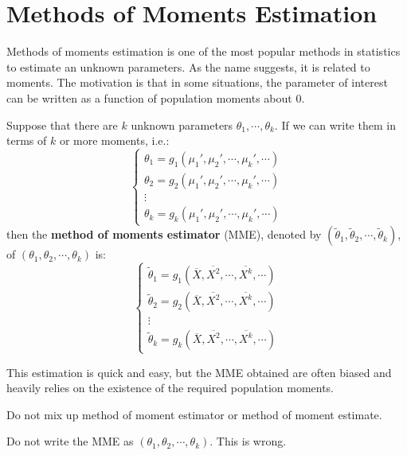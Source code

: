 \documentclass{huhtakm-template-book-v2}
\begin{document}
\section{Methods of Moments Estimation}
Methods of moments estimation is one of the most popular methods in statistics to estimate an unknown parameters. As the name suggests, it is related to moments. The motivation is that in some situations, the parameter of interest can be written as a function of population moments about $0$.
\begin{defn}
	Suppose that there are $k$ unknown parameters $\theta_{1},\cdots,\theta_{k}$. If we can write them in terms of $k$ or more moments, i.e.:
	\begin{equation*}
		\begin{cases}
			\theta_{1}=g_{1}(\mu_{1}',\mu_{2}',\cdots,\mu_{k}',\cdots)\\
			\theta_{2}=g_{2}(\mu_{1}',\mu_{2}',\cdots,\mu_{k}',\cdots)\\
			\vdots\\
			\theta_{k}=g_{k}(\mu_{1}',\mu_{2}',\cdots,\mu_{k}',\cdots)
		\end{cases}
	\end{equation*}
	then the \textbf{method of moments estimator} (MME), denoted by $(\tilde{\theta}_{1},\tilde{\theta}_{2},\cdots,\tilde{\theta}_{k})$, of $(\theta_{1},\theta_{2},\cdots,\theta_{k})$ is:
	\begin{equation*}
		\begin{cases}
			\tilde{\theta}_{1}=g_{1}(\overline{X},\overline{X^{2}},\cdots,\overline{X^{k}},\cdots)\\
			\tilde{\theta}_{2}=g_{2}(\overline{X},\overline{X^{2}},\cdots,\overline{X^{k}},\cdots)\\
			\vdots\\
			\tilde{\theta}_{k}=g_{k}(\overline{X},\overline{X^{2}},\cdots,\overline{X^{k}},\cdots)
		\end{cases}
	\end{equation*}
\end{defn}
\begin{rem}
	This estimation is quick and easy, but the MME obtained are often biased and heavily relies on the existence of the required population moments.
\end{rem}
\begin{rem}
	Do not mix up method of moment estimator or method of moment estimate.
\end{rem}
\begin{rem}
	Do not write the MME as $(\theta_{1},\theta_{2},\cdots,\theta_{k})$. This is wrong.
\end{rem}
\end{document}
